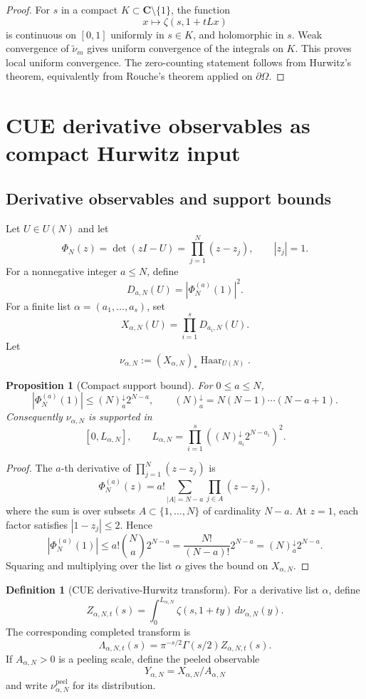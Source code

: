 \documentclass[11pt]{article}
\newcommand{\C}{\mathbf C}
\newcommand{\Haar}{\operatorname{Haar}}
\newcommand{\fall}[2]{(#1)^{\downarrow}_{#2}}
\theoremstyle{plain}
\newtheorem{proposition}[theorem]{Proposition}
\theoremstyle{definition}
\newtheorem{definition}[theorem]{Definition}
\begin{document}
\begin{proof}
For \(s\) in a compact \(K\subset\C\setminus\{1\}\), the function
\[
   x\mapsto \zeta(s,1+tLx)
\]
is continuous on \([0,1]\) uniformly in \(s\in K\), and holomorphic in \(s\).  Weak convergence of \(\widetilde\nu_m\) gives uniform convergence of the integrals on \(K\).  This proves local uniform convergence.  The zero-counting statement follows from Hurwitz's theorem, equivalently from Rouche's theorem applied on \(\partial\Omega\).
\end{proof}

\section{CUE derivative observables as compact Hurwitz input}

\subsection{Derivative observables and support bounds}

Let \(U\in U(N)\) and let
\[
   \Phi_N(z)=\det(zI-U)=\prod_{j=1}^N(z-z_j),
   \qquad |z_j|=1.
\]
For a nonnegative integer \(a\le N\), define
\[
   D_{a,N}(U)=|\Phi_N^{(a)}(1)|^2.
\]
For a finite list \(\alpha=(a_1,\ldots,a_s)\), set
\[
   X_{\alpha,N}(U)=\prod_{i=1}^sD_{a_i,N}(U).
\]
Let
\[
   \nu_{\alpha,N}:=(X_{\alpha,N})_*\Haar_{U(N)}.
\]

\begin{proposition}[Compact support bound]\label{prop:derivative-support-bound}
For \(0\le a\le N\),
\[
   |\Phi_N^{(a)}(1)|\le \fall{N}{a}2^{N-a},
   \qquad
   \fall{N}{a}=N(N-1)\cdots(N-a+1).
\]
Consequently \(\nu_{\alpha,N}\) is supported in
\[
   \left[0,L_{\alpha,N}\right],
   \qquad
   L_{\alpha,N}=\prod_{i=1}^s\left(\fall{N}{a_i}2^{N-a_i}\right)^2.
\]
\end{proposition}

\begin{proof}
The \(a\)-th derivative of \(\prod_{j=1}^N(z-z_j)\) is
\[
   \Phi_N^{(a)}(z)=a!\sum_{|A|=N-a}\prod_{j\in A}(z-z_j),
\]
where the sum is over subsets \(A\subset\{1,\ldots,N\}\) of cardinality \(N-a\).  At \(z=1\), each factor satisfies \(|1-z_j|\le2\).  Hence
\[
   |\Phi_N^{(a)}(1)|\le a!\binom Na2^{N-a}=\frac{N!}{(N-a)!}2^{N-a}=\fall{N}{a}2^{N-a}.
\]
Squaring and multiplying over the list \(\alpha\) gives the bound on \(X_{\alpha,N}\).
\end{proof}

\begin{definition}[CUE derivative-Hurwitz transform]\label{def:cue-hurwitz}
For a derivative list \(\alpha\), define
\[
   Z_{\alpha,N,t}(s)=\int_0^{L_{\alpha,N}}\zeta(s,1+ty)\,d\nu_{\alpha,N}(y).
\]
The corresponding completed transform is
\[
   \Lambda_{\alpha,N,t}(s)=\pi^{-s/2}\Gamma(s/2)Z_{\alpha,N,t}(s).
\]
If \(A_{\alpha,N}>0\) is a peeling scale, define the peeled observable
\[
   Y_{\alpha,N}=X_{\alpha,N}/A_{\alpha,N}
\]
and write \(\nu_{\alpha,N}^{\operatorname{peel}}\) for its distribution.
\end{definition}
\end{document}
